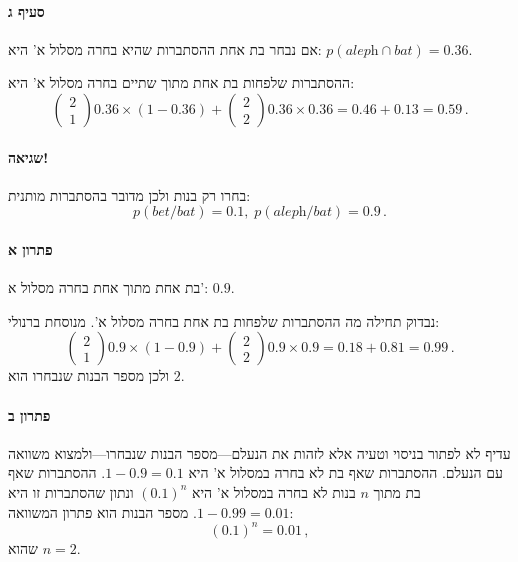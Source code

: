 \documentclass[12pt,a4paper]{article}
\begin{document}
\vspace{-1ex}\paragraph{סעיף ג}

אם נבחר בת אחת ההסתברות שהיא בחרה מסלול א' היא:
$p(\textit{aleph}\cap \textit{bat})=0.36$.

ההסתברות שלפחות בת אחת מתוך שתיים בחרה מסלול א' היא:
\[
\left(\begin{array}{c}2\\1\end{array}\right) 0.36 \times (1-0.36) +
\left(\begin{array}{c}2\\2\end{array}\right) 0.36 \times 0.36 = 0.46+0.13=0.59\,.
\]

\vspace{-6ex}\paragraph{שגיאה!}
בחרו רק בנות ולכן מדובר בהסתברות מותנית:
\[
p(\textit{bet} / \textit{bat}) = 0.1, \; p(\textit{aleph} / \textit{bat}) = 0.9\,.
\]
\vspace{-2ex}\paragraph{פתרון א}
בת אחת מתוך אחת בחרה מסלול א':
$0.9$.

נבדוק תחילה מה ההסתברות שלפחות בת אחת
\textbf{}
בחרה מסלול א'. מנוסחת ברנולי:
\[
\left(\begin{array}{c}2\\1\end{array}\right) 0.9 \times (1-0.9) +
\left(\begin{array}{c}2\\2\end{array}\right) 0.9 \times 0.9 = 0.18+0.81=0.99\,.
\]
ולכן מספר הבנות שנבחרו הוא
$2$.

\vspace{-2ex}\paragraph{פתרון ב}
עדיף לא לפתור בניסוי וטעיה אלא לזהות את הנעלם---מספר הבנות שנבחרו---ולמצוא משוואה עם הנעלם. ההסתברות שאף בת לא בחרה במסלול א' היא
$1-0.9=0.1$.
ההסתברות שאף בת מתוך $n$ בנות לא בחרה במסלול א' היא
$(0.1)^n$
ונתון שהסתברות זו היא
$1-0.99=0.01$.
מספר הבנות הוא פתרון המשוואה:
\[
(0.1)^n = 0.01\,,
\]
שהוא
$n=2$.
\end{document}
